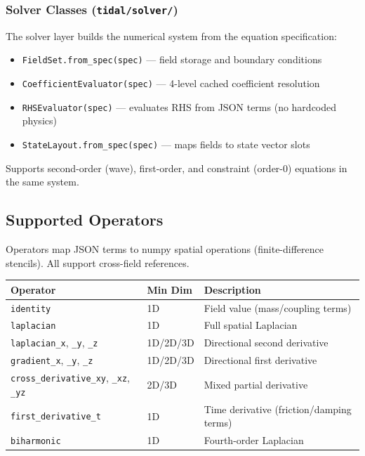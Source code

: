 \subsubsection{Solver Classes (\texttt{tidal/solver/})}

The solver layer builds the numerical system from the equation specification:

\begin{itemize}
  \item \texttt{FieldSet.from\_spec(spec)} --- field storage and boundary conditions
  \item \texttt{CoefficientEvaluator(spec)} --- 4-level cached coefficient resolution
  \item \texttt{RHSEvaluator(spec)} --- evaluates RHS from JSON terms (no hardcoded physics)
  \item \texttt{StateLayout.from\_spec(spec)} --- maps fields to state vector slots
\end{itemize}

Supports second-order (wave), first-order, and constraint (order-0) equations in the same system.

\subsection{Supported Operators}

Operators map JSON terms to numpy spatial operations (finite-difference stencils). All support cross-field references.

\begin{table}[htbp]
\centering
\begin{tabular}{@{}lll@{}}
\toprule
Operator & Min Dim & Description \\
\midrule
\texttt{identity}                     & 1D     & Field value (mass/coupling terms) \\
\texttt{laplacian}                    & 1D     & Full spatial Laplacian \\
\texttt{laplacian\_x}, \texttt{\_y}, \texttt{\_z} & 1D/2D/3D & Directional second derivative \\
\texttt{gradient\_x}, \texttt{\_y}, \texttt{\_z}  & 1D/2D/3D & Directional first derivative \\
\texttt{cross\_derivative\_xy}, \texttt{\_xz}, \texttt{\_yz} & 2D/3D & Mixed partial derivative \\
\texttt{first\_derivative\_t}         & 1D     & Time derivative (friction/damping terms) \\
\texttt{biharmonic}                   & 1D     & Fourth-order Laplacian \\
\bottomrule
\end{tabular}
\end{table}

